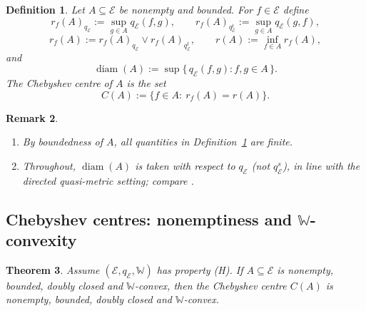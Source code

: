 \documentclass[preprint,12pt]{elsarticle}
\numberwithin{equation}{section}
\newtheorem{theorem}{Theorem}[section]
\newtheorem{definition}[theorem]{Definition}
\newtheorem{remark}[theorem]{Remark}
\newcommand{\E}{\mathcal{E}}
\newcommand{\diam}{\operatorname{diam}}
\begin{document}
\begin{definition}\label{def:ChebHull}
Let $A\subseteq \E$ be nonempty and bounded. For $f\in \E$ define
\[
r_f(A)_{q_{\E}}:=\sup_{g\in A}q_{\E}(f,g),\qquad
r_f(A)_{q_{\E}^{t}}:=\sup_{g\in A}q_{\E}(g,f),
\]
\[
r_f(A):=r_f(A)_{q_{\E}}\vee r_f(A)_{q_{\E}^{t}},\qquad
r(A):=\inf_{f\in A} r_f(A),
\]
and
\[
\diam(A):=\sup\{\,q_{\E}(f,g): f,g\in A\,\}.
\]
The \emph{Chebyshev centre} of $A$ is the set
\[
C(A):=\{f\in A:\ r_f(A)=r(A)\}.
\]
\end{definition}

\begin{remark}\label{rem:ChebHull-remarks}
\begin{enumerate}[label=(\alph*),leftmargin=2.2em]
\item By boundedness of $A$, all quantities in Definition~\ref{def:ChebHull} are finite.
\item Throughout, $\diam(A)$ is taken with respect to $q_{\E}$ (not $q_{\E}^{s}$), in line with
the directed quasi-metric setting; compare \cite{KunziYildiz2016,OlelaZweni2023}.
\end{enumerate}
\end{remark}

\subsection{Chebyshev centres: nonemptiness and $\mathbb{W}$-convexity}

\begin{theorem}\label{thm:ChebConvex}
Assume $(\E,q_{\E},\mathbb{W})$ has property {\rm(H)}.
If $A\subseteq \E$ is nonempty, bounded, doubly closed and $\mathbb{W}$-convex, then the Chebyshev centre
$C(A)$ is nonempty, bounded, doubly closed and $\mathbb{W}$-convex.
\end{theorem}
\end{document}
